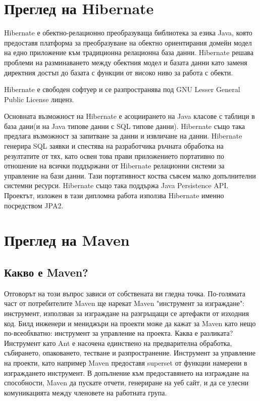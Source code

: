 \section{Преглед на Hibernate}
Hibernate е обектно-релационно преобразуваща библиотека за езика Java,
която предоставя платформа за преобразуване на обектно ориентирания
домейн модел на едно приложение към традиционна релационна база
данни. Hibernate решава проблеми на разминаването между обектния модел
и базата данни като заменя директния достъп до базата с функции от
високо ниво за работа с обекти.

Hibernate е свободен софтуер и се разпространява под GNU Lesser
General Public License лиценз.

Основната възможност на Hibernate е асоциирането на Java класове с
таблици в база дани(и на Java типове данни с SQL типове
данни). Hibernate също така предлага възможност за запитване за данни
и извличане на данни. Hibernate генерира SQL заявки и спестява на
разработчика ръчната обработка на резултатите от тях, като освен това
прави приложението портативно по отношение на всички поддържани от
Hibernate релационни системи за управление на бази данни. Тази
портативност коства съвсем малко допълнителни системни
ресурси. Hibernate също така поддържа Java Persistence API. Проектът,
изложен в тази дипломна работа използва Hibernate именно посредством
JPA2.
\section{Преглед на Maven}
\subsection{Какво е Maven?} 
Отговорът на този въпрос зависи от собствената ви
гледна точка. По-голямата част от потребителите Maven ще нарекат Maven
"инструмент за изграждане": инструмент, използван за изграждане на
разгръщащи се артефакти от изходния код. Билд инженери и мениджъри на
проекти може да кажат за Maven като нещо по-всеобхватно: инструмент за
управление на проекта. Каква е разликата? Инструмент като Ant е
насочена единствено на предварителна обработка, събирането,
опаковането, тестване и разпространение. Инструмент за управление на
проекти, като например Maven предоставя superset от функции намерени в
изграждането инструмент. В допълнение към предоставянето на изграждане
на способности, Maven да пускате отчети, генериране на уеб сайт, и да
се улесни комуникацията между членовете на работната група.

